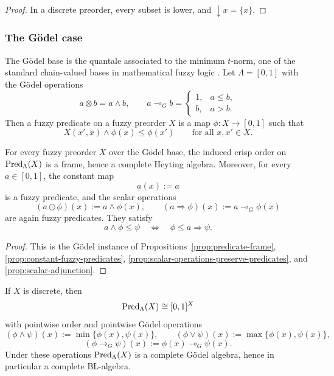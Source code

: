 \begin{proof}
    In a discrete preorder, every subset is lower, and \(\downarrow x=\{x\}\).
\end{proof}

\subsubsection{The G\"odel case}

The G\"odel base is the quantale associated to the minimum \(t\)-norm, one of the standard chain-valued bases in mathematical fuzzy logic \cite[Example~2.4]{stubbe-2014-quantaloid-enriched} \cite[Sections~1, 2, and~7]{sep-logic-fuzzy}. Let \(\Lambda=[0,1]\) with the G\"odel operations
\[
    a\otimes b=a\wedge b,
    \qquad
    a\multimap_G b=
    \begin{cases}
        1,&a\leq b,\\
        b,&a>b.
    \end{cases}
\]
Then a fuzzy predicate on a fuzzy preorder \(X\) is a map \(\phi:X\to [0,1]\) such that
\[
    X(x',x)\wedge \phi(x)\leq \phi(x')
    \qquad
    \text{for all }x,x'\in X.
\]

\begin{proposition}
\label{prop:godel-predicate-algebra}
    For every fuzzy preorder \(X\) over the G\"odel base, the induced crisp order on \(\mathrm{Pred}_\Lambda(X)\) is a frame, hence a complete Heyting algebra. Moreover, for every \(a\in [0,1]\), the constant map
    \[
        \underline{a}(x):=a
    \]
    is a fuzzy predicate, and the scalar operations
    \[
        (a\odot \phi)(x):=a\wedge \phi(x),
        \qquad
        (a\Rightarrow \phi)(x):=a\multimap_G \phi(x)
    \]
    are again fuzzy predicates. They satisfy
    \[
        a\wedge \phi\leq \psi
        \quad\Longleftrightarrow\quad
        \phi\leq a\Rightarrow \psi.
    \]
\end{proposition}

\begin{proof}
    This is the G\"odel instance of Propositions~\ref{prop:predicate-frame}, \ref{prop:constant-fuzzy-predicates}, \ref{prop:scalar-operations-preserve-predicates}, and \ref{prop:scalar-adjunction}.
\end{proof}

\begin{corollary}
\label{cor:godel-discrete-predicate-algebra}
    If \(X\) is discrete, then
    \[
        \mathrm{Pred}_\Lambda(X)\cong [0,1]^X
    \]
    with pointwise order and pointwise G\"odel operations
    \[
        (\phi\wedge\psi)(x):=\min\{\phi(x),\psi(x)\},
        \qquad
        (\phi\vee\psi)(x):=\max\{\phi(x),\psi(x)\},
    \]
    \[
        (\phi\to_G\psi)(x):=\phi(x)\multimap_G\psi(x).
    \]
    Under these operations \(\mathrm{Pred}_\Lambda(X)\) is a complete G\"odel algebra, hence in particular a complete BL-algebra.
\end{corollary}

